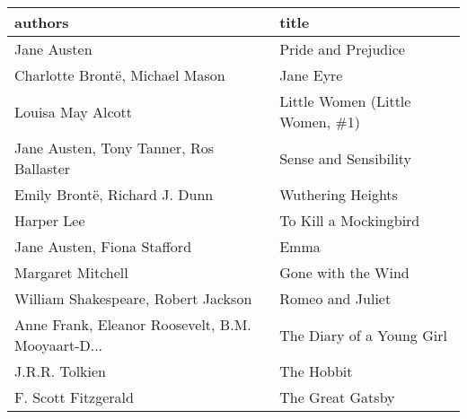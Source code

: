 \begin{tabular}{ll}
\toprule
                                           authors &                            title \\
\midrule
                                       Jane Austen &              Pride and Prejudice \\
                   Charlotte Brontë, Michael Mason &                        Jane Eyre \\
                                 Louisa May Alcott &  Little Women (Little Women, \#1) \\
           Jane Austen, Tony Tanner, Ros Ballaster &            Sense and Sensibility \\
                     Emily Brontë, Richard J. Dunn &                Wuthering Heights \\
                                        Harper Lee &            To Kill a Mockingbird \\
                       Jane Austen, Fiona Stafford &                             Emma \\
                                 Margaret Mitchell &               Gone with the Wind \\
     William Shakespeare, Robert           Jackson &                 Romeo and Juliet \\
 Anne Frank, Eleanor Roosevelt, B.M. Mooyaart-D... &        The Diary of a Young Girl \\
                                    J.R.R. Tolkien &                       The Hobbit \\
                               F. Scott Fitzgerald &                 The Great Gatsby \\
\bottomrule
\end{tabular}
